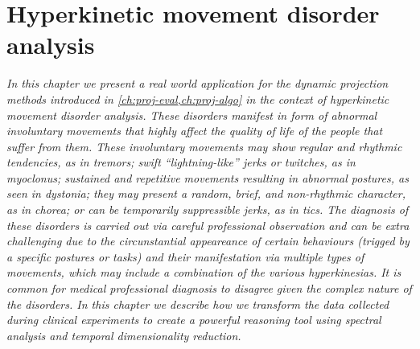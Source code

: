 \chapter{Hyperkinetic movement disorder analysis}
\label{ch:nemo}

\textit{
In this chapter we present a real world application for the dynamic projection methods introduced in \cref{ch:proj-eval,ch:proj-algo} in the context of hyperkinetic movement disorder analysis. These disorders manifest in form of abnormal involuntary movements that highly affect the quality of life of the people that suffer from them. These involuntary movements may show regular and rhythmic tendencies, as in tremors; swift ``lightning-like'' jerks or twitches, as in myoclonus; sustained and repetitive movements resulting in abnormal postures, as seen in dystonia; they may present a random, brief, and non-rhythmic character, as in chorea; or can be temporarily suppressible jerks, as in tics.
The diagnosis of these disorders is carried out via careful professional observation and can be extra challenging due to the circunstantial appeareance of certain behaviours (trigged by a specific postures or tasks) and their manifestation via multiple types of movements, which may include a combination of the various hyperkinesias. It is common for medical professional diagnosis to disagree given the complex nature of the disorders.
In this chapter we describe how we transform the data collected during clinical experiments to create a powerful reasoning tool using spectral analysis and temporal dimensionality reduction. 
}

\vspace{5mm} %





